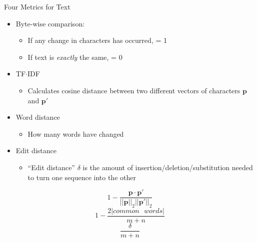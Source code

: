 \documentclass[10pt]{beamer}
\begin{document}
\begin{frame}{Four Metrics for Text}
\begin{minipage}{0.6\textwidth}
\begin{itemize}
\large\item Byte-wise comparison:
\begin{itemize}
\item If any change in characters has occurred, = 1
\item If text is \textit{exactly} the same, = 0
\end{itemize}
\item TF$\cdot$IDF \\
\begin{itemize}
\item Calculates cosine distance between two different vectors of characters $\boldsymbol{p}$ and $\boldsymbol{p}'$
\end{itemize}
\item Word distance
\begin{itemize}
\item How many words have changed
\end{itemize}
\item Edit distance
\begin{itemize}
\item ``Edit distance'' $\delta$ is the amount of insertion/deletion/substitution needed to turn one sequence into the other
\end{itemize}
\end{itemize}
\end{minipage}
\begin{minipage}{0.38\textwidth}
\Large
\vspace{10mm}
\begin{equation*}
1-\frac{\boldsymbol{p}\cdot \boldsymbol{p}'}{||\boldsymbol{p}||_2||\boldsymbol{p}'||_2}
\end{equation*}
\vspace{5mm}
\begin{equation*}
1-\frac{2|common \text{ } words|}{m+n}
\end{equation*}
\vspace{1mm}
\begin{equation*}
\frac{\delta}{m + n}
\end{equation*}
\end{minipage}
\end{frame}
\end{document}
